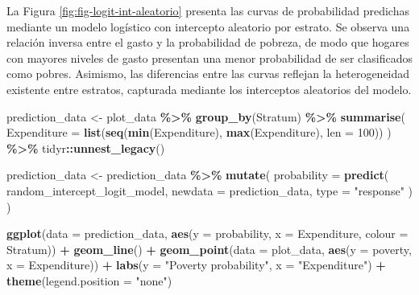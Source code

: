 \documentclass[
  spanish,
  12pt,
]{book}
\newenvironment{Shaded}{\begin{snugshade}}{\end{snugshade}}
\newcommand{\AttributeTok}[1]{\textcolor[rgb]{0.13,0.29,0.53}{#1}}
\newcommand{\DecValTok}[1]{\textcolor[rgb]{0.00,0.00,0.81}{#1}}
\newcommand{\FunctionTok}[1]{\textcolor[rgb]{0.13,0.29,0.53}{\textbf{#1}}}
\newcommand{\NormalTok}[1]{#1}
\newcommand{\OtherTok}[1]{\textcolor[rgb]{0.56,0.35,0.01}{#1}}
\newcommand{\SpecialCharTok}[1]{\textcolor[rgb]{0.81,0.36,0.00}{\textbf{#1}}}
\newcommand{\StringTok}[1]{\textcolor[rgb]{0.31,0.60,0.02}{#1}}
\begin{document}
La Figura \ref{fig:fig-logit-int-aleatorio} presenta las curvas de probabilidad predichas mediante un modelo logístico con intercepto aleatorio por estrato. Se observa una relación inversa entre el gasto y la probabilidad de pobreza, de modo que hogares con mayores niveles de gasto presentan una menor probabilidad de ser clasificados como pobres. Asimismo, las diferencias entre las curvas reflejan la heterogeneidad existente entre estratos, capturada mediante los interceptos aleatorios del modelo.

\begin{Shaded}
\begin{Highlighting}[]
\NormalTok{prediction\_data }\OtherTok{\textless{}{-}}\NormalTok{ plot\_data }\SpecialCharTok{\%\textgreater{}\%}
  \FunctionTok{group\_by}\NormalTok{(Stratum) }\SpecialCharTok{\%\textgreater{}\%}
  \FunctionTok{summarise}\NormalTok{(}
    \AttributeTok{Expenditure =} \FunctionTok{list}\NormalTok{(}\FunctionTok{seq}\NormalTok{(}\FunctionTok{min}\NormalTok{(Expenditure), }\FunctionTok{max}\NormalTok{(Expenditure), }\AttributeTok{len =} \DecValTok{100}\NormalTok{))}
\NormalTok{  ) }\SpecialCharTok{\%\textgreater{}\%}
\NormalTok{  tidyr}\SpecialCharTok{::}\FunctionTok{unnest\_legacy}\NormalTok{()}

\NormalTok{prediction\_data }\OtherTok{\textless{}{-}}\NormalTok{ prediction\_data }\SpecialCharTok{\%\textgreater{}\%}
  \FunctionTok{mutate}\NormalTok{(}
    \AttributeTok{probability =} \FunctionTok{predict}\NormalTok{(}
\NormalTok{      random\_intercept\_logit\_model,}
      \AttributeTok{newdata =}\NormalTok{ prediction\_data,}
      \AttributeTok{type =} \StringTok{"response"}
\NormalTok{    )}
\NormalTok{  )}
\end{Highlighting}
\end{Shaded}

\begin{Shaded}
\begin{Highlighting}[]
\FunctionTok{ggplot}\NormalTok{(}\AttributeTok{data =}\NormalTok{ prediction\_data,}
       \FunctionTok{aes}\NormalTok{(}\AttributeTok{y =}\NormalTok{ probability, }\AttributeTok{x =}\NormalTok{ Expenditure, }\AttributeTok{colour =}\NormalTok{ Stratum)) }\SpecialCharTok{+}
  \FunctionTok{geom\_line}\NormalTok{() }\SpecialCharTok{+}
  \FunctionTok{geom\_point}\NormalTok{(}\AttributeTok{data =}\NormalTok{ plot\_data,}
             \FunctionTok{aes}\NormalTok{(}\AttributeTok{y =}\NormalTok{ poverty, }\AttributeTok{x =}\NormalTok{ Expenditure)) }\SpecialCharTok{+}
  \FunctionTok{labs}\NormalTok{(}\AttributeTok{y =} \StringTok{"Poverty probability"}\NormalTok{, }\AttributeTok{x =} \StringTok{"Expenditure"}\NormalTok{) }\SpecialCharTok{+}
  \FunctionTok{theme}\NormalTok{(}\AttributeTok{legend.position =} \StringTok{"none"}\NormalTok{)}
\end{Highlighting}
\end{Shaded}
\end{document}
